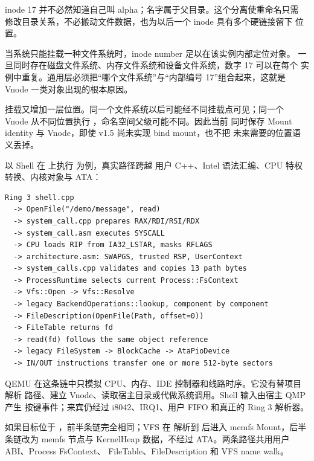 inode 17 并不必然知道自己叫 alpha；名字属于父目录。这个分离使重命名只需
修改目录关系，不必搬动文件数据，也为以后一个 inode 具有多个硬链接留下
位置。

当系统只能挂载一种文件系统时，inode number 足以在该实例内部定位对象。
一旦同时存在磁盘文件系统、内存文件系统和设备文件系统，数字 17 可以在每个
实例中重复。通用层必须把“哪个文件系统”与“内部编号 17”组合起来，这就是
Vnode 一类对象出现的根本原因。

挂载又增加一层位置。同一个文件系统以后可能经不同挂载点可见；同一个 Vnode
从不同位置执行 ，命名空间父级可能不同。因此当前 
同时保存 Mount identity 与 Vnode，即使 v1.5 尚未实现 bind mount，也不把
未来需要的位置语义丢掉。

以 Shell 在  上执行  为例，真实路径跨越
用户 C++、Intel 语法汇编、CPU 特权转换、内核对象与 ATA：

\begin{lstlisting}[caption={v1.5 文件读取的端到端路径}]
Ring 3 shell.cpp
  -> OpenFile("/demo/message", read)
  -> system_call.cpp prepares RAX/RDI/RSI/RDX
  -> system_call.asm executes SYSCALL
  -> CPU loads RIP from IA32_LSTAR, masks RFLAGS
  -> architecture.asm: SWAPGS, trusted RSP, UserContext
  -> system_calls.cpp validates and copies 13 path bytes
  -> ProcessRuntime selects current Process::FsContext
  -> Vfs::Open -> Vfs::Resolve
  -> legacy BackendOperations::lookup, component by component
  -> FileDescription(OpenFile(Path, offset=0))
  -> FileTable returns fd
  -> read(fd) follows the same object reference
  -> legacy FileSystem -> BlockCache -> AtaPioDevice
  -> IN/OUT instructions transfer one or more 512-byte sectors
\end{lstlisting}

QEMU 在这条链中只模拟 CPU、内存、IDE 控制器和线路时序。它没有替项目解析
路径、建立 Vnode、读取宿主目录或代做系统调用。Shell 输入由宿主 QMP 产生
按键事件；来宾仍经过 i8042、IRQ1、用户 FIFO 和真正的 Ring 3 解析器。

如果目标位于 ，前半条链完全相同；VFS 在
解析到  后进入 memfs Mount，后半条链改为 memfs 节点与
KernelHeap 数据，不经过 ATA。两条路径共用用户 ABI、Process FsContext、
FileTable、FileDescription 和 VFS name walk。

